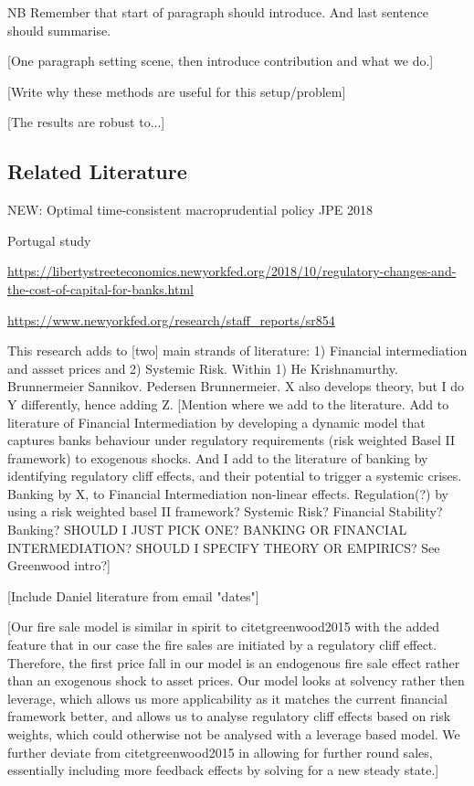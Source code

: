 \documentclass[11pt]{article}
\begin{document}
NB Remember that start of paragraph should introduce. And last sentence should summarise.

[One paragraph setting scene, then introduce contribution and what we do.]


[Write why these methods are useful for this setup/problem]
	
[The results are robust to...]



\subsection*{Related Literature}

NEW: Optimal time-consistent macroprudential policy JPE 2018

Portugal study

\url{https://libertystreeteconomics.newyorkfed.org/2018/10/regulatory-changes-and-the-cost-of-capital-for-banks.html}

\url{https://www.newyorkfed.org/research/staff_reports/sr854}

This research adds to [two] main strands of literature: 1) Financial intermediation and assset prices and 2) Systemic Risk.
Within 1) He Krishnamurthy. Brunnermeier Sannikov. Pedersen Brunnermeier. 
X also develops theory, but I do Y differently, hence adding Z.
[Mention where we add to the literature. Add to literature of Financial Intermediation by developing a dynamic model that captures banks behaviour under regulatory requirements (risk weighted Basel II framework) to exogenous shocks. And I add to the literature of banking by identifying regulatory cliff effects, and their potential to trigger a systemic crises. Banking by X, to Financial Intermediation non-linear effects. Regulation(?) by using a risk weighted basel II framework? Systemic Risk? Financial Stability? Banking? SHOULD I JUST PICK ONE? BANKING OR FINANCIAL INTERMEDIATION? SHOULD I SPECIFY THEORY OR EMPIRICS? See Greenwood intro?]

[Include Daniel literature from email "dates"]


[Our fire sale model is similar in spirit to citet{greenwood2015} with the added feature that in our case the fire sales are initiated by a regulatory cliff effect. Therefore, the first price fall in our model is an endogenous fire sale effect rather than an exogenous shock to asset prices. Our model looks at solvency rather then leverage, which allows us more applicability as it matches the current financial framework better, and allows us to analyse regulatory cliff effects based on risk weights, which could otherwise not be analysed with a leverage based model. We further deviate from citet{greenwood2015} in allowing for further round sales, essentially including more feedback effects by solving for a new steady state.]
\end{document}
